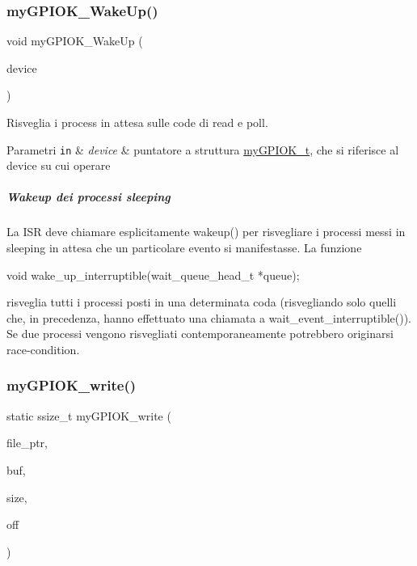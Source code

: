 \subsubsection{\texorpdfstring{my\+G\+P\+I\+O\+K\+\_\+\+Wake\+Up()}{myGPIOK\_WakeUp()}}
{\footnotesize\ttfamily void my\+G\+P\+I\+O\+K\+\_\+\+Wake\+Up (\begin{DoxyParamCaption}\item[{\hyperlink{structmy_g_p_i_o_k__t}{my\+G\+P\+I\+O\+K\+\_\+t} $\ast$}]{device }\end{DoxyParamCaption})}



Risveglia i process in attesa sulle code di read e poll. 


\begin{DoxyParams}[1]{Parametri}
\mbox{\tt in}  & {\em device} & puntatore a struttura \hyperlink{structmy_g_p_i_o_k__t}{my\+G\+P\+I\+O\+K\+\_\+t}, che si riferisce al device su cui operare\\
\hline
\end{DoxyParams}
\subparagraph*{Wakeup dei processi sleeping}

La I\+SR deve chiamare esplicitamente wakeup() per risvegliare i processi messi in sleeping in attesa che un particolare evento si manifestasse. La funzione 
\begin{DoxyCode}
\textcolor{keywordtype}{void} wake\_up\_interruptible(wait\_queue\_head\_t *queue);
\end{DoxyCode}
 risveglia tutti i processi posti in una determinata coda (risvegliando solo quelli che, in precedenza, hanno effettuato una chiamata a wait\+\_\+event\+\_\+interruptible()). Se due processi vengono risvegliati contemporaneamente potrebbero originarsi race-\/condition. \mbox{\label{group___linux-_driver_ga1eea0f6c86e8966ba9b701da57502aad}} 
\subsubsection{\texorpdfstring{my\+G\+P\+I\+O\+K\+\_\+write()}{myGPIOK\_write()}}
{\footnotesize\ttfamily static ssize\+\_\+t my\+G\+P\+I\+O\+K\+\_\+write (\begin{DoxyParamCaption}\item[{struct file $\ast$}]{file\+\_\+ptr,  }\item[{const char $\ast$}]{buf,  }\item[{size\+\_\+t}]{size,  }\item[{loff\+\_\+t $\ast$}]{off }\end{DoxyParamCaption})\hspace{0.3cm}{\ttfamily [static]}}



